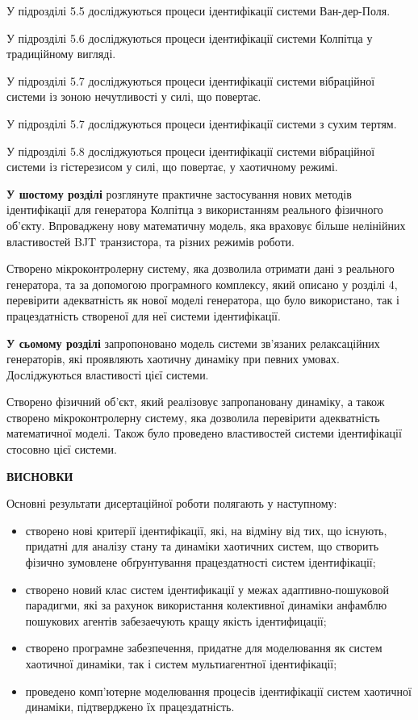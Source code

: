 \documentclass[a4paper,12pt]{atuaref}
\newcommand{\xsect}[1]{\medskip\begin{center}\textbf{#1}\end{center}\medskip\penalty10000}
\begin{document}
У підрозділі 5.5 досліджуються процеси ідентифікації системи Ван-дер-Поля.

У підрозділі 5.6 досліджуються процеси ідентифікації системи Колпітца у традиційному вигляді.

У підрозділі 5.7 досліджуються процеси ідентифікації системи вібраційної системи
із зоною нечутливості у силі, що повертає.

У підрозділі 5.7 досліджуються процеси ідентифікації системи з сухим тертям.

У підрозділі 5.8 досліджуються процеси ідентифікації системи  вібраційної системи
із гістерезисом у силі, що повертає, у хаотичному режимі.

\textbf{У шостому розділі}
розглянуте практичне застосування
нових методів ідентифікації для генератора Колпітца
з використанням реального фізичного об'єкту.
Впроваджену нову математичну модель,
яка враховує більше нелінійних властивостей
BJT транзистора, та різних режимів роботи.

Створено мікроконтролерну систему, яка
дозволила отримати дані з реального
генератора, та за допомогою програмного комплексу,
який описано у розділі 4, перевірити адекватність як
нової моделі генератора, що було використано,
так і працездатність створеної для неї системи ідентифікації.



\textbf{У сьомому розділі}
запропоновано модель
системи зв'язаних релаксаційних генераторів,
які проявляють хаотичну динаміку при певних умовах.
Досліджуються  властивості цієї системи.

Створено фізичний об'єкт,
який реалізовує запропановану динаміку,
а також
створено мікроконтролерну систему, яка
дозволила перевірити адекватність математичної моделі.
Також було проведено властивостей системи ідентифікації стосовно цієї системи.

\xsect{ВИСНОВКИ}

Основні результати дисертаційної роботи полягають у наступному:

\begin{itemize}

  \item
  створено нові критерії ідентифікації, які, на відміну від тих, що
  існують, придатні для аналізу стану та динаміки
  хаотичних систем, що створить фізично зумовлене обґрунтування працездатності систем
  ідентифікації;

  \item
  створено новий клас систем ідентификації у межах
    адаптивно-пошуковой парадигми,
    які за рахунок використання колективної динаміки
    анфамблю пошукових агентів забезаечують
    кращу якість ідентифицації;

  \item
  створено програмне забезпечення, придатне для моделювання як систем
  хаотичної динаміки, так і систем мультиагентної ідентифікації;

  \item
  проведено комп'ютерне моделювання процесів ідентифікації систем
  хаотичної динаміки, підтверджено їх працездатність.


\end{itemize}
\end{document}
